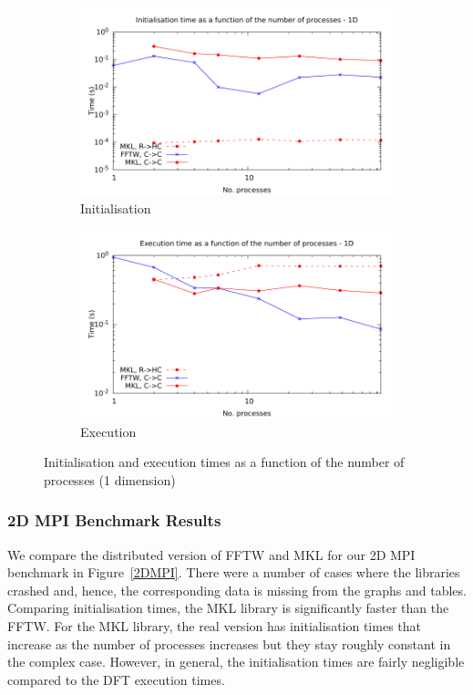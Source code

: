 \documentclass[12pt, a4paper]{article} \setlength{\textheight}{24cm}
\begin{document}
\begin{figure}[H]
  \centering
  \begin{subfigure}{.5\textwidth}
    \centering
    \includegraphics[width=.9\linewidth]{graphs/mpi-init-1d.pdf}
    \caption{Initialisation}
    \label{1DMPII}
  \end{subfigure}%
  \begin{subfigure}{.5\textwidth}
    \centering
    \includegraphics[width=.9\linewidth]{graphs/mpi-exec-1d.pdf}
    \caption{Execution}
    \label{1DMPIE}
  \end{subfigure}
  \caption{Initialisation and execution times as a function of the
    number of processes (1 dimension)}
  \label{1DMPI}
\end{figure}


\subsubsection{2D MPI Benchmark Results}
We compare the distributed version of FFTW and MKL for our 2D MPI
benchmark in Figure~\ref{2DMPI}. There were a number of cases where
the libraries crashed and, hence, the corresponding data is missing
from the graphs and tables. Comparing initialisation times, the MKL
library is significantly faster than the FFTW. For the MKL library,
the real version has initialisation times that increase as the number
of processes increases but they stay roughly constant in the complex
case. However, in general, the initialisation times are fairly
negligible compared to the DFT execution times.
\end{document}
